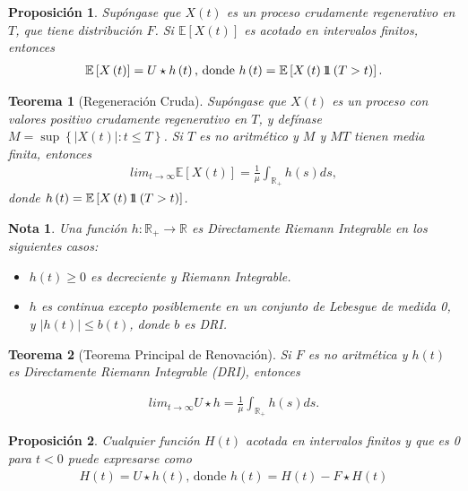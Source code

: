 \documentclass{article}
\newtheorem{Teo}{Teorema}[section]
\newtheorem{Note}{Nota}[section]
\newtheorem{Prop}{Proposición}[section]
\newcommand{\rea}{\mathbb{R}}
\newcommand{\esp}{\mathbb{E}}
\newcommand{\indora}{\mbox{$1$\hspace{-0.8ex}$1$}}
\numberwithin{equation}{section}
\begin{document}
\begin{Prop}
Sup\'ongase que $X\left(t\right)$ es un proceso crudamente regenerativo en $T$, que tiene distribuci\'on $F$. Si $\esp\left[X\left(t\right)\right]$ es acotado en intervalos finitos, entonces
\begin{eqnarray*}
\esp\left[X\left(t\right)\right]=U\star h\left(t\right)\textrm{,  donde }h\left(t\right)=\esp\left[X\left(t\right)\indora\left(T>t\right)\right].
\end{eqnarray*}
\end{Prop}

\begin{Teo}[Regeneraci\'on Cruda]
Sup\'ongase que $X\left(t\right)$ es un proceso con valores positivo crudamente regenerativo en $T$, y def\'inase $M=\sup\left\{|X\left(t\right)|:t\leq T\right\}$. Si $T$ es no aritm\'etico y $M$ y $MT$ tienen media finita, entonces
\begin{eqnarray*}
lim_{t\rightarrow\infty}\esp\left[X\left(t\right)\right]=\frac{1}{\mu}\int_{\rea_{+}}h\left(s\right)ds,
\end{eqnarray*}
donde $h\left(t\right)=\esp\left[X\left(t\right)\indora\left(T>t\right)\right]$.
\end{Teo}


\begin{Note} Una funci\'on $h:\rea_{+}\rightarrow\rea$ es Directamente Riemann Integrable en los siguientes casos:
\begin{itemize}
\item[a)] $h\left(t\right)\geq0$ es decreciente y Riemann Integrable.
\item[b)] $h$ es continua excepto posiblemente en un conjunto de Lebesgue de medida 0, y $|h\left(t\right)|\leq b\left(t\right)$, donde $b$ es DRI.
\end{itemize}
\end{Note}

\begin{Teo}[Teorema Principal de Renovaci\'on]
Si $F$ es no aritm\'etica y $h\left(t\right)$ es Directamente Riemann Integrable (DRI), entonces

\begin{eqnarray*}
lim_{t\rightarrow\infty}U\star h=\frac{1}{\mu}\int_{\rea_{+}}h\left(s\right)ds.
\end{eqnarray*}
\end{Teo}

\begin{Prop}
Cualquier funci\'on $H\left(t\right)$ acotada en intervalos finitos y que es 0 para $t<0$ puede expresarse como
\begin{eqnarray*}
H\left(t\right)=U\star h\left(t\right)\textrm{,  donde }h\left(t\right)=H\left(t\right)-F\star H\left(t\right)
\end{eqnarray*}
\end{Prop}
\end{document}

